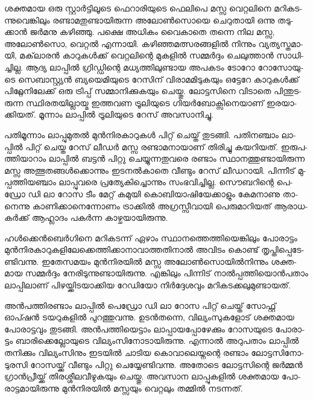 ­ശ­ക്ത­മായ ഒരു സ്റ്റാര്‍­ട്ടി­ലൂ­ടെ ഫെ­റാ­രി­യു­ടെ ഫെ­ലി­പെ മസ്സ വെ­റ്റ­ലി­നെ മറി­ക­ട­ന്നു­വെ­ങ്കി­ലും രണ്ടാ­മ­തു­ണ്ടാ­യി­രു­ന്ന 
അലോണ്‍­സൊ­യെ ചെ­റു­താ­യി ഒന്നു തടു­ക്കാന്‍ ജര്‍­മ­നു കഴി­ഞ്ഞു. പക്ഷെ അധി­കം വൈ­കാ­തെ തന്നെ നില മസ്സ, 
അലോണ്‍­സൊ, വെ­റ്റല്‍ എന്നാ­യി. കഴി­ഞ്ഞ­മ­ത്സ­ര­ങ്ങ­ളില്‍ നി­ന്നും വ്യ­ത്യ­സ്ത­മാ­യി, മക്‌­ലാ­രന്‍ കാ­റു­കള്‍­ക്ക് വെ­റ്റ­ലി­ന്റെ 
മു­ക­ളില്‍ സമ്മര്‍­ദ്ദം ചെ­ലു­ത്താന്‍ സാ­ധി­ച്ചി­ല്ല. ആദ്യ ലാ­പ്പില്‍ ഗ്രി­ഡ്ഡി­ന്റെ മധ്യ­ത്തി­ലു­ണ്ടായ അപ­ക­ടം ടോ­റോ റോ­സോ­യു­ടെ 
സെ­ബാ­സ്റ്റ്യന്‍ ബ്യ­യെ­മി­യു­ടെ റേ­സി­ന് വി­രാ­മ­മി­ടു­ക­യും ഒട്ടേ­റേ കാ­റു­കള്‍­ക്ക് പി­റ്റ്ലേ­നി­ലേ­ക്ക് ഒരു ട്രി­പ്പ് സമ്മാ­നി­ക്കു­ക­യും 
ചെ­യ്തു. ലോ­ട്ട­സി­നെ വി­ടാ­തെ പി­ന്തു­ട­രു­ന്ന സ്ഥി­ര­ത­യി­ല്ലാ­യ്മ ഇത്ത­വണ ട്രൂ­ലി­യു­ടെ ഗി­യര്‍­ബോ­ക്സി­നെ­യാ­ണ് ഇര­യാ­ക്കി­യ­ത്. 
മൂ­ന്നാം ലാ­പ്പില്‍ ട്രൂ­ലി­യു­ടെ റേ­സ് അവ­സാ­നി­ച്ചു­.

­പ­തി­മൂ­ന്നാം ലാ­പ്പു­മു­തല്‍ മുന്‍­നി­ര­കാ­റു­കള്‍ പി­റ്റ് ചെ­യ്ത് തു­ട­ങ്ങി. പതി­ന­ഞ്ചാം ലാ­പ്പില്‍ പി­റ്റ് ചെ­യ്ത റേ­സ് ലീ­ഡര്‍ മസ്സ 
രണ്ടാ­മ­നാ­യാ­ണ് തി­രി­ച്ചു കയ­റി­യ­ത്. ഇരു­പ­ത്തി­യാ­റാം ലാ­പ്പില്‍ ബട്ടന്‍ പി­റ്റു ചെ­യ്യു­ന്ന­തു­വ­രെ രണ്ടാം 
സ്ഥാ­ന­ത്തു­ണ്ടാ­യി­രു­ന്ന മസ്സ അത്ഭു­ത­ങ്ങള്‍­ക്കൊ­ന്നും ഇട­നല്‍­കാ­തെ വീ­ണ്ടും റേ­സ് ലീ­ഡ­റാ­യി. പി­ന്നീ­ട് മു­പ്പ­ത്തി­യ­ഞ്ചാം 
ലാ­പ്പു­വ­രെ പ്ര­ത്യേ­കി­ച്ചൊ­ന്നും സം­ഭ­വി­ച്ചി­ല്ല. സൌ­ബ­റി­ന്റെ ­പെ­ഡ്രോ ഡി ലാ റോ­സ ടീം മേ­റ്റ് കമു­യി 
കൊ­ബി­യാ­ഷി­യേ­ക്കാ­ളും കേ­മ­നാ­ണു താ­നെ­ന്നു കാ­ണി­ക്കാ­നെ­ന്നോ­ണം ട്രാ­ക്കില്‍ അഗ്ര­സ്സീ­വാ­യി പെ­രു­മാ­റി­യ­ത് 
ആരാ­ധ­കര്‍­ക്ക് ആഹ്ലാ­ദം പകര്‍­ന്ന കാ­ഴ്ച­യാ­യി­രു­ന്നു­.

­ഹള്‍­ക്കെന്‍­ബെര്‍­ഗി­നെ മറി­ക­ട­ന്ന് ഏഴാം സ്ഥാ­ന­ത്തെ­ത്തി­യെ­ങ്കി­ലും പോ­രാ­ട്ടം 
മുന്‍­നി­ര­കാ­റു­ക­ളി­ലേ­ക്കെ­ത്തി­ക്കാ­നാ­വാ­ത്ത­തി­നാല്‍ അവി­ടം കൊ­ണ്ട് തൃ­പ്തി­പ്പെ­ടേ­ണ്ടി­വ­ന്നു. ഇതേ­സ­മ­യം മുന്‍­നി­ര­യില്‍ 
മസ്സ അലോണ്‍­സൊ­യില്‍­നി­ന്നും ശക്ത­മായ സമ്മര്‍­ദ്ദം നേ­രി­ടു­ന്നു­ണ്ടാ­യി­രു­ന്നു. എങ്കി­ലും പി­ന്നി­ട് നാല്‍­പ്പ­ത്തി­യൊന്‍­പ­താം 
ലാ­പ്പി­ലാ­ണ് പി­ഴ­യ്ക്കി­ട­യാ­ക്കിയ റേ­ഡി­യോ നിര്‍­ദ്ദേ­ശ­വും മറി­ക­ട­ക്ക­ലു­മു­ണ്ടാ­യ­ത്.

അന്‍­പ­ത്തി­ര­ണ്ടാം ലാ­പ്പില്‍ പെ­ഡ്രോ ഡി ലാ റോസ പി­റ്റ് ചെ­യ്ത് സോ­ഫ്റ്റ് ഓപ്ഷന്‍ ടയ­റു­ക­ളില്‍ പു­റ­ത്തു­വ­ന്നു. ഉടന്‍­ത­ന്നെ, 
വി­ല്യം­സു­ക­ളോ­ട് ശക്ത­മായ പോ­രാ­ട്ട­വും തു­ട­ങ്ങി. അന്‍­പ­ത്തി­യെ­ട്ടാം ലാ­പ്പാ­യ­പ്പോ­ഴേ­ക്കും റോ­സ­യു­ടെ പോ­രാ­ട്ടം 
ബാ­രി­ക്കെ­ല്ലോ­യു­ടെ വി­ല്യം­സി­നോ­ടാ­യി­രു­ന്നു. എന്നാല്‍ അറു­പ­താം ലാ­പ്പില്‍ തനി­ക്കും വി­ല്യം­സി­നും ഇട­യില്‍ ചാ­ടിയ 
കൊ­വാ­ലെ­യ്ന­ന്റെ രണ്ടാം ലോ­ട്ട­സി­നോ­ടു­ര­സി റോ­സ­യ്ക്ക് വീ­ണ്ടും പി­റ്റു ചെ­യ്യേ­ണ്ടി­വ­ന്നു. അതോ­ടെ ലോ­ട്ട­സി­ന്റെ ജര്‍­മ്മന്‍ 
ഗ്രാന്‍­പ്രീ­യ്ക്ക് തി­ര­ശ്ശീ­ല­വീ­ഴു­ക­യും ചെ­യ്തു. അവ­സാന ലാ­പ്പു­ക­ളില്‍ ശക്ത­മായ പോ­രാ­ട്ട­മാ­യി­രു­ന്നു മുന്‍­നി­ര­യില്‍ മസ്സ­യും 
വെ­റ്റ­ലും തമ്മില്‍ നട­ന്ന­ത്.

